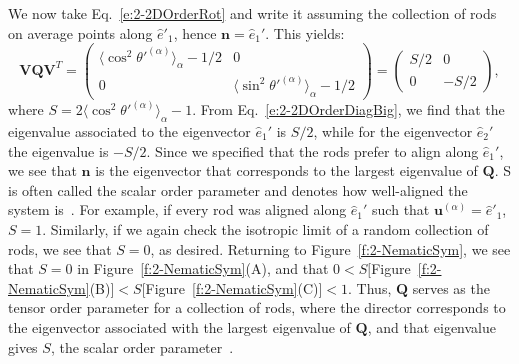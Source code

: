 We now take Eq.~\ref{e:2-2DOrderRot} and write it assuming the collection of rods on average points along $\hat{e}'_1$, hence $\mathbf{n} = \hat{e}_1'$.
This yields:
\begin{equation}
  \mathbf{V} \mathbf{Q} \mathbf{V}^T =
  \begin{pmatrix}
    \langle \cos^2 \theta'^{(\alpha)}\rangle_{\alpha} - 1/2 & 0 \\
    0 & \langle \sin^2 \theta'^{(\alpha)} \rangle_{\alpha} - 1/2
  \end{pmatrix} =
  \begin{pmatrix}
    S/2 & 0 \\
    0 & -S/2
  \end{pmatrix},\label{e:2-2DOrderDiagBig}
\end{equation}
where $S = 2 \langle \cos^2 \theta'^{(\alpha)} \rangle_{\alpha} - 1$.
From Eq.~\ref{e:2-2DOrderDiagBig}, we find that the eigenvalue associated to the eigenvector $\hat{e}_1'$ is $S/2$, while for the eigenvector $\hat{e}_2'$ the eigenvalue is $-S/2$.
Since we specified that the rods prefer to align along $\hat{e}_1'$, we see that $\mathbf{n}$ is the eigenvector that corresponds to the largest eigenvalue of $\mathbf{Q}$.
S is often called the scalar order parameter and denotes how well-aligned the system is~\cite{RN33}.
For example, if every rod was aligned along $\hat{e}_1'$ such that $\mathbf{u}^{(\alpha)} = \hat{e}'_1$, $S = 1$.
Similarly, if we again check the isotropic limit of a random collection of rods, we see that $S = 0$, as desired.
Returning to Figure~\ref{f:2-NematicSym}, we see that $S=0$ in Figure~\ref{f:2-NematicSym}(A), and that $0 < S\big[$Figure~\ref{f:2-NematicSym}(B)$\big] < S\big[$Figure~\ref{f:2-NematicSym}(C)$\big] < 1$.
Thus, $\mathbf{Q}$ serves as the tensor order parameter for a collection of rods, where the director corresponds to the eigenvector associated with the largest eigenvalue of $\mathbf{Q}$, and that eigenvalue gives $S$, the scalar order parameter~\cite{RN33,RN175}.

